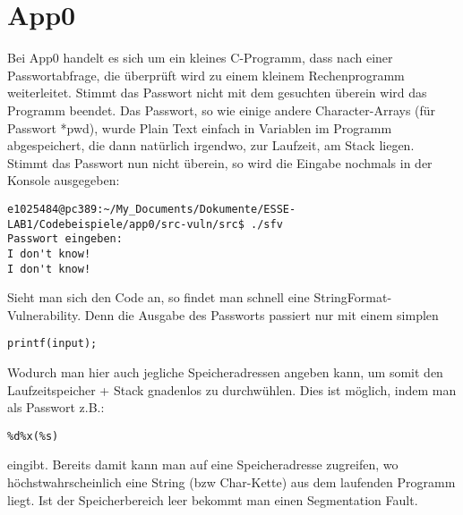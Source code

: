 \section{App0}
Bei App0 handelt es sich um ein kleines C-Programm, dass nach einer Passwortabfrage, die überprüft wird zu einem kleinem Rechenprogramm weiterleitet. Stimmt das Passwort nicht mit dem gesuchten überein wird das Programm beendet. Das Passwort, so wie einige andere Character-Arrays (für Passwort *pwd), wurde Plain Text einfach in Variablen im Programm abgespeichert, die dann natürlich irgendwo, zur Laufzeit, am Stack liegen.\linebreak
Stimmt das Passwort nun nicht überein, so wird die Eingabe nochmals in der Konsole ausgegeben:
\begin{lstlisting}
e1025484@pc389:~/My_Documents/Dokumente/ESSE-LAB1/Codebeispiele/app0/src-vuln/src$ ./sfv
Passwort eingeben: 
I don't know!
I don't know!

\end{lstlisting}
Sieht man sich den Code an, so findet man schnell eine StringFormat-Vulnerability. Denn die Ausgabe des Passworts passiert nur mit einem simplen
\begin{lstlisting}
printf(input);
\end{lstlisting}
Wodurch man hier auch jegliche Speicheradressen angeben kann, um somit den Laufzeitspeicher + Stack gnadenlos zu durchwühlen. Dies ist möglich, indem man
als Passwort z.B.:
\begin{lstlisting}
%d%x(%s)
\end{lstlisting}
eingibt. Bereits damit kann man auf eine Speicheradresse zugreifen, wo höchstwahrscheinlich eine String (bzw Char-Kette) aus dem laufenden Programm liegt. Ist der Speicherbereich leer bekommt man einen Segmentation Fault. 
